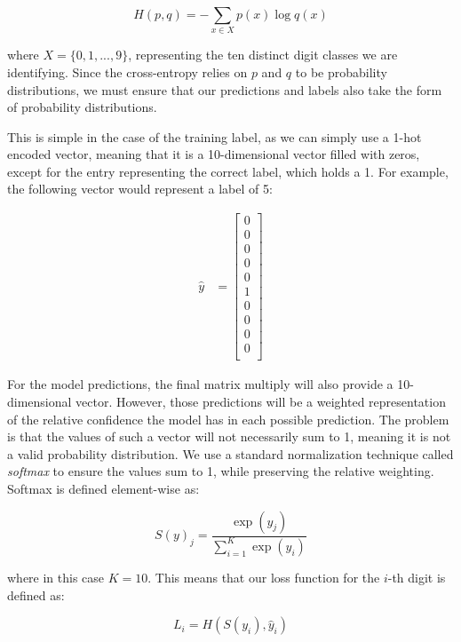 \documentclass[12pt]{article}
\begin{document}
\begin{equation}
	H(p,q) = -\sum_{x \in X} p(x) \log q(x)
\end{equation}

where $X = \{0, 1, ..., 9 \}$, representing the ten distinct digit classes we are identifying.
Since the cross-entropy relies on $p$ and $q$ to be probability distributions, we must ensure that our predictions and labels also take the form of probability distributions.

This is simple in the case of the training label, as we can simply use a 1-hot encoded vector, meaning that it is a 10-dimensional vector filled with zeros, except for the entry representing the correct label, which holds a 1.
For example, the following vector would represent a label of 5:

\begin{align}
	\hat{y} &= \begin{bmatrix}
		0 \\
		0 \\
		0 \\
		0 \\
		0 \\
		1 \\
		0 \\
		0 \\
		0 \\
		0 \\
	\end{bmatrix} 
\end{align}

For the model predictions, the final matrix multiply will also provide a 10-dimensional vector.
However, those predictions will be a weighted representation of the relative confidence the model has in each possible prediction.
The problem is that the values of such a vector will not necessarily sum to 1, meaning it is not a valid probability distribution.
We use a standard normalization technique called \textit{softmax} to ensure the values sum to 1, while preserving the relative weighting.
Softmax is defined element-wise as:

\begin{equation}
	S(y)_j = \frac{\exp(y_j)}{\sum_{i=1}^K \exp(y_i)}
\end{equation}

where in this case $K=10$.
This means that our loss function for the $i$-th digit is defined as:

\begin{equation}
	L_i = H(S(y_i), \hat{y}_i)
\end{equation}
\end{document}
